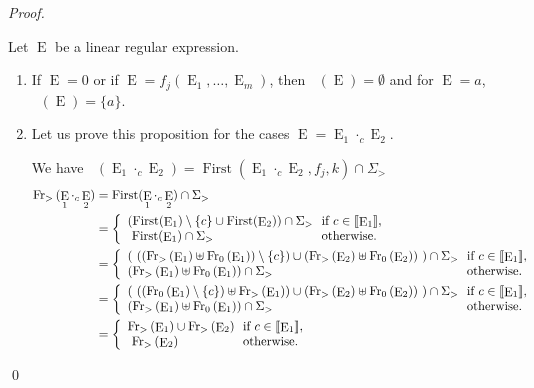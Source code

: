 \documentclass{llncs}
\DeclareMathOperator{\First}{First}
\DeclareMathOperator{\E}{E}
\DeclareMathOperator{\Fir}{Fr_>}
\DeclareMathOperator{\Firs}{Fr_0}
\def\firstt#1{\Fir{(#1)}}
\def\firs#1{\Firs{(#1)}}
\begin{document}
\begin{proof}
\begin{sloppy}  
  
Let $\E$ be a linear regular expression. 
\begin{enumerate}
\item If $\E=0$ or if $\E=f_j(\E_1,\ldots,\E_m)$, then $\firs{\E}=\emptyset$ and for $\E=a$, $\firs{\E}=\{a\}$.  

\item Let us prove this proposition for the cases $\E=\E_1\cdot_c \E_2$. 

We have $\firs{\E_1\cdot_c \E_2}=\First(\E_1\cdot_c \E_2,f_j,k)\cap{\Sigma}_{>} $
 \begin{align*} 
\firstt{\E_1\cdot_c \E_2}&=\First(\E_1\cdot_c \E_2)\cap{\Sigma}_{>} \\ 
&=\left\{
          \begin{array}{l@{\ }l}
            (\First(\E_1)\setminus\{c\}\cup \First(\E_2))\cap{\Sigma}_{>}  & \mbox{ if } c \in\llbracket{\E_1}\rrbracket,\\
             \ \First(\E_1)\cap\Sigma_{>} & \text{ otherwise.}\\ 
          \end{array}
        \right.\\
&=\left\{
    \begin{array}{l@{\ }l}
(~((\firstt{\E_1}\uplus \firs{\E_1})\setminus\{c\})\cup (\firstt{\E_2}\uplus\firs{\E_2})~)\cap{\Sigma}_{>}  & \mbox{ if } c \in\llbracket{\E_1}\rrbracket,\\
     (\firstt{\E_1}\uplus \firs{\E_1})\cap{\Sigma}_{>}  & \text{ otherwise.}\\ 
          \end{array}
        \right.\\
        &=\left\{
    \begin{array}{l@{\ }l}
(~((\firs{\E_1}\setminus\{c\})\uplus \firstt{\E_1})\cup (\firstt{\E_2}\uplus\firs{\E_2})~)\cap{\Sigma}_{>}  & \mbox{ if } c \in\llbracket{\E_1}\rrbracket,\\
     (\firstt{\E_1}\uplus \firs{\E_1})\cap{\Sigma}_{>} & \text{ otherwise.}\\ 
          \end{array}
        \right.\\
&=\left\{
    \begin{array}{l@{\ }l}
\firstt{\E_1}\cup \firstt{\E_2} & \mbox{ if } c \in\llbracket{\E_1}\rrbracket,\\
    \ \firstt{\E_2} & \text{ otherwise.}\\ 
          \end{array}
        \right.\\
\end{align*}
\end{enumerate}
\end{sloppy}  
\qed
\end{proof}
\end{document}
